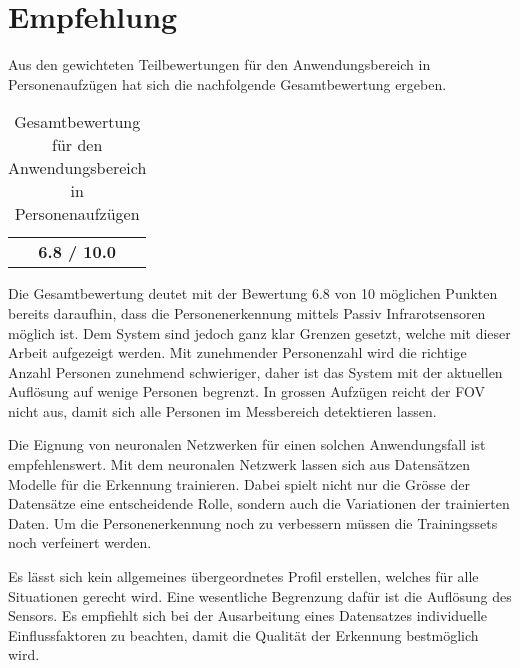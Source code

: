  \newpage

\section{Empfehlung}
\label{sec:Empfehlung}

Aus den gewichteten Teilbewertungen für den Anwendungsbereich in Personenaufzügen hat sich die nachfolgende Gesamtbewertung ergeben.

\begin{table}[H]
	\centering
	\caption[Gesamtbewertung für den Anwendungsbereich in Personenaufzügen]{Gesamtbewertung für den Anwendungsbereich in Personenaufzügen}
	\label{tab:Gesamtbewertung}
	\begin{tabular}{|c|}
		\hline
		\rowcolor[HTML]{9B9B9B} 
		\multicolumn{1}{|c|}{\cellcolor[HTML]{9B9B9B}\textbf{Gesamtbewertung}} \\ \hline
		\textbf{6.8 / 10.0 }                                                                   \\ \hline
	\end{tabular}
\end{table} 

Die Gesamtbewertung deutet mit der Bewertung 6.8 von 10 möglichen Punkten bereits daraufhin, dass die Personenerkennung mittels Passiv Infrarotsensoren möglich ist. Dem System sind jedoch ganz klar Grenzen gesetzt, welche mit dieser Arbeit aufgezeigt werden. Mit zunehmender Personenzahl wird die richtige Anzahl Personen zunehmend schwieriger, daher ist das System mit der aktuellen Auflösung auf wenige Personen begrenzt. In grossen Aufzügen reicht der \ac{FOV} nicht aus, damit sich alle Personen im Messbereich detektieren lassen.

Die Eignung von neuronalen Netzwerken für einen solchen Anwendungsfall ist empfehlenswert. Mit dem neuronalen Netzwerk lassen sich aus Datensätzen Modelle für die Erkennung trainieren. Dabei spielt nicht nur die Grösse der Datensätze eine entscheidende Rolle, sondern auch die Variationen der trainierten Daten. Um die Personenerkennung noch zu verbessern müssen die Trainingssets noch verfeinert werden. 

Es lässt sich kein allgemeines übergeordnetes Profil erstellen, welches für alle Situationen gerecht wird. Eine wesentliche Begrenzung dafür ist die Auflösung des Sensors. Es empfiehlt sich bei der Ausarbeitung eines Datensatzes individuelle Einflussfaktoren zu beachten, damit die Qualität der Erkennung bestmöglich wird. 

